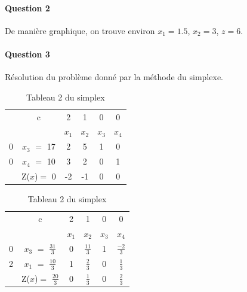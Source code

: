 \documentclass[a4paper, 12pt]{article}
\begin{document}
\paragraph{Question 2}
De manière graphique, on trouve environ $x_1 = 1.5$, $x_2 = 3$, $z = 6$.

\paragraph{Question 3}

Résolution du problème donné par la méthode du simplexe.

\begin{table}[h!]	
\centering
	\begin{tabular}{|c|c|c|c|c|c|}
	\hline
      & c & 2 & 1 & 0 & 0 \\ 
      \cline{2-6}
       &  & $x_{1}$ & $x_{2}$  & $x_{3}$  & $x_{4}$ \\
       \hline
   0 & $x_{3}$  $=$ 17 & 2 & 5 & 1 & 0 \\
      \hline
	0 & $x_{4}$ $=$ 10  & 3 & 2 & 0 & 1 \\
	  \hline
	 & Z($x$)$=$ 0 & -2 & -1 & 0 & 0\\
	  \hline
	\end{tabular}
\caption {Tableau 1 du simplex}	
\centering
	\begin{tabular}{|c|c|c|c|c|c|}
	\hline
      & c & 2 & 1 & 0 & 0 \\ 
      \cline{2-6}
       &  & $x_{1}$ & $x_{2}$  & $x_{3}$  & $x_{4}$ \\
       \hline
   0 & $x_{3}$  $=$ $\frac{31}{3}$ & 0 & $\frac{11}{3}$ & 1 & $\frac{-2}{3}$ \\
      \hline
	2 & $x_{1}$ $=$ $\frac{10}{3}$  & 1 & $\frac{2}{3}$ & 0 & $\frac{1}{3}$ \\
	  \hline
	 & Z($x$)$=$ $\frac{20}{3}$ & 0 & $\frac{1}{3}$ & 0 & $\frac{2}{3}$\\
	  \hline
	\end{tabular}
\caption {Tableau 2 du simplex}
\end{table}
\end{document}

